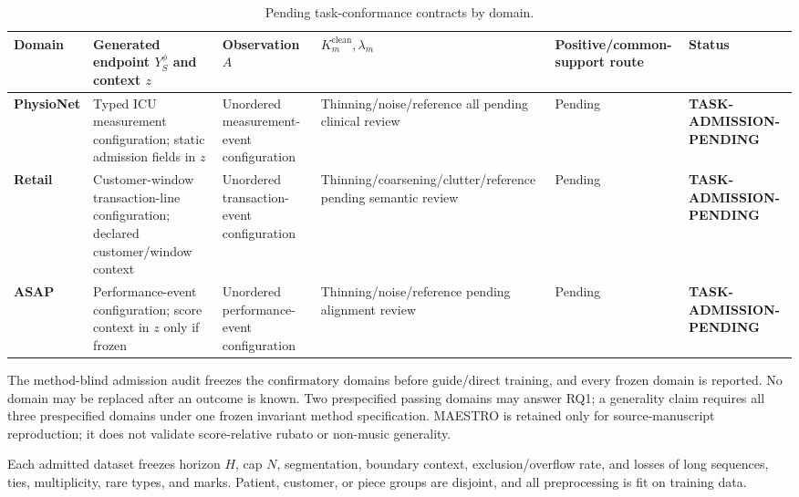 \documentclass[11pt]{article}
\begin{document}
\begin{landscape}
\begin{table}[p]
\centering
\scriptsize
\renewcommand{\arraystretch}{1.18}
\setlength{\tabcolsep}{3.5pt}
\caption{Pending task-conformance contracts by domain.}\label{tab:task-conformance}
\begin{tabularx}{\linewidth}{@{}*{6}{Y}@{}}
\toprule
\textbf{Domain} & \textbf{Generated endpoint \(Y_S^\phi\) and context \(z\)} & \textbf{Observation \(A\)} & \textbf{\(K_m^{\mathrm{clean}},\lambda_m\)} & \textbf{Positive/\allowbreak{}common-support route} & \textbf{Status} \\
\midrule
\textbf{PhysioNet} & Typed ICU measurement configuration; static admission fields in \(z\) & Unordered measurement-event configuration & Thinning/\allowbreak{}noise/\allowbreak{}reference all pending clinical review & Pending & \textbf{TASK-ADMISSION-PENDING} \\
\textbf{Retail} & Customer-window transaction-line configuration; declared customer/\allowbreak{}window context & Unordered transaction-event configuration & Thinning/\allowbreak{}coarsening/\allowbreak{}clutter/\allowbreak{}reference pending semantic review & Pending & \textbf{TASK-ADMISSION-PENDING} \\
\textbf{ASAP} & Performance-event configuration; score context in \(z\) only if frozen & Unordered performance-event configuration & Thinning/\allowbreak{}noise/\allowbreak{}reference pending alignment review & Pending & \textbf{TASK-ADMISSION-PENDING} \\
\bottomrule
\end{tabularx}
\end{table}
\end{landscape}

The method-blind admission audit freezes the confirmatory domains before guide/\allowbreak{}direct training, and every frozen domain is reported. No domain may be replaced after an outcome is known. Two prespecified passing domains may answer RQ1; a generality claim requires all three prespecified domains under one frozen invariant method specification. MAESTRO is retained only for source-manuscript reproduction; it does not validate score-relative rubato or non-music generality.

Each admitted dataset freezes horizon \(H\), cap \(N\), segmentation, boundary context, exclusion/\allowbreak{}overflow rate, and losses of long sequences, ties, multiplicity, rare types, and marks. Patient, customer, or piece groups are disjoint, and all preprocessing is fit on training data.
\end{document}

